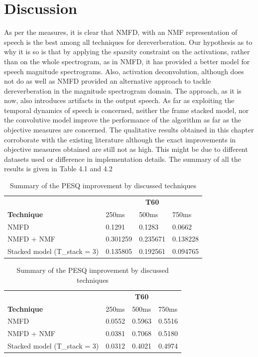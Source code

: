 \section{Discussion}
As per the measures, it is clear that NMFD, with an NMF representation of speech is the best among all techniques for dereverberation. Our hypothesis as to why it is so is that by applying the sparsity constraint on the activations, rather than on the whole spectrogram, as in NMFD, it has provided a better model for speech magnitude spectrograms. Also, activation deconvolution, although does not do as well as NMFD provided an alternative approach to tackle dereverberation in the magnitude spectrogram domain. The approach, as it is now, also introduces artifacts in the output speech. 
As far as exploiting the temporal dynamics of speech is concerned, neither the frame stacked model, nor the convolutive model improve the performance of the algorithm as far as the objective measures are concerned. 
The qualitative results obtained in this chapter corroborate with the existing literature \cite{moham} although the exact improvements in objective measures obtained are still not as high. This might be due to different datasets used or difference in implementation details. The summary of all the results is given in Table 4.1 and 4.2

\begin{table}
\centering
\caption{Summary of the PESQ improvement by discussed techniques}
\label{my-label}
\begin{tabular}{llll}
                             & \multicolumn{3}{c}{\textbf{T60}} \\
\textbf{Technique}           & 250ms     & 500ms     & 750ms    \\
NMFD                         & 0.1291    & 0.1283    & 0.0662   \\
NMFD + NMF                   & 0.301259  & 0.235671  & 0.138228 \\
Stacked model (T\_stack = 3) & 0.135805  & 0.192561  & 0.094765
\end{tabular}
\end{table}

\begin{table}[]
\centering
\caption{Summary of the PESQ improvement by discussed techniques}
\label{my-label}
\begin{tabular}{llll}
                             & \multicolumn{3}{c}{\textbf{T60}} \\
\textbf{Technique}           & 250ms     & 500ms     & 750ms    \\
NMFD                         & 0.0552    & 0.5963    & 0.5516   \\
NMFD + NMF                   & 0.0381    & 0.7068    & 0.5180   \\
Stacked model (T\_stack = 3) & 0.0312    & 0.4021    & 0.4974  
\end{tabular}
\end{table}